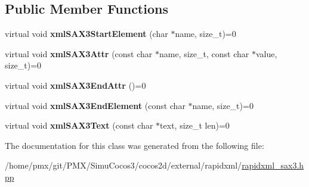 \subsection*{Public Member Functions}
\begin{DoxyCompactItemize}
\item 
\mbox{\label{classrapidxml_1_1xml__sax3__handler_a557c3bf1fb1e28b433c48953c94a3c00}} 
virtual void {\bfseries xml\+S\+A\+X3\+Start\+Element} (char $\ast$name, size\+\_\+t)=0
\item 
\mbox{\label{classrapidxml_1_1xml__sax3__handler_a1ada0d245f0a93e3a242904e45407fd9}} 
virtual void {\bfseries xml\+S\+A\+X3\+Attr} (const char $\ast$name, size\+\_\+t, const char $\ast$value, size\+\_\+t)=0
\item 
\mbox{\label{classrapidxml_1_1xml__sax3__handler_aafd51950677711d49b67d05f70fb0ec7}} 
virtual void {\bfseries xml\+S\+A\+X3\+End\+Attr} ()=0
\item 
\mbox{\label{classrapidxml_1_1xml__sax3__handler_ac720f6ba55beefb1fd6d7d4fe96646ef}} 
virtual void {\bfseries xml\+S\+A\+X3\+End\+Element} (const char $\ast$name, size\+\_\+t)=0
\item 
\mbox{\label{classrapidxml_1_1xml__sax3__handler_a71b786c27b062175734fee7b6d74d4f5}} 
virtual void {\bfseries xml\+S\+A\+X3\+Text} (const char $\ast$text, size\+\_\+t len)=0
\end{DoxyCompactItemize}


The documentation for this class was generated from the following file\+:\begin{DoxyCompactItemize}
\item 
/home/pmx/git/\+P\+M\+X/\+Simu\+Cocos3/cocos2d/external/rapidxml/\hyperlink{rapidxml__sax3_8hpp}{rapidxml\+\_\+sax3.\+hpp}\end{DoxyCompactItemize}
